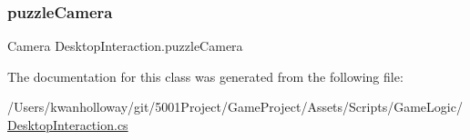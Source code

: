 \subsubsection{\texorpdfstring{puzzle\+Camera}{puzzleCamera}}
{\footnotesize\ttfamily Camera Desktop\+Interaction.\+puzzle\+Camera}



The documentation for this class was generated from the following file\+:\begin{DoxyCompactItemize}
\item 
/\+Users/kwanholloway/git/5001\+Project/\+Game\+Project/\+Assets/\+Scripts/\+Game\+Logic/\hyperlink{_desktop_interaction_8cs}{Desktop\+Interaction.\+cs}\end{DoxyCompactItemize}
